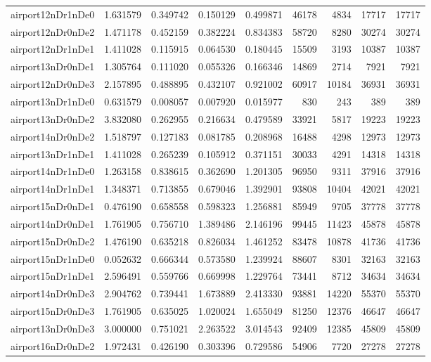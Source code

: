\begin{longtable}{|l|r|r|r|r|r|r|r|r|}
airport12nDr1nDe0 & 1.631579 & 0.349742 & 0.150129 & 0.499871 & 46178 & 4834 & 17717 & 17717 \\
airport12nDr0nDe2 & 1.471178 & 0.452159 & 0.382224 & 0.834383 & 58720 & 8280 & 30274 & 30274 \\
airport12nDr1nDe1 & 1.411028 & 0.115915 & 0.064530 & 0.180445 & 15509 & 3193 & 10387 & 10387 \\
airport13nDr0nDe1 & 1.305764 & 0.111020 & 0.055326 & 0.166346 & 14869 & 2714 & 7921 & 7921 \\
airport12nDr0nDe3 & 2.157895 & 0.488895 & 0.432107 & 0.921002 & 60917 & 10184 & 36931 & 36931 \\
airport13nDr1nDe0 & 0.631579 & 0.008057 & 0.007920 & 0.015977 & 830 & 243 & 389 & 389 \\
airport13nDr0nDe2 & 3.832080 & 0.262955 & 0.216634 & 0.479589 & 33921 & 5817 & 19223 & 19223 \\
airport14nDr0nDe2 & 1.518797 & 0.127183 & 0.081785 & 0.208968 & 16488 & 4298 & 12973 & 12973 \\
airport13nDr1nDe1 & 1.411028 & 0.265239 & 0.105912 & 0.371151 & 30033 & 4291 & 14318 & 14318 \\
airport14nDr1nDe0 & 1.263158 & 0.838615 & 0.362690 & 1.201305 & 96950 & 9311 & 37916 & 37916 \\
airport14nDr1nDe1 & 1.348371 & 0.713855 & 0.679046 & 1.392901 & 93808 & 10404 & 42021 & 42021 \\
airport15nDr0nDe1 & 0.476190 & 0.658558 & 0.598323 & 1.256881 & 85949 & 9705 & 37778 & 37778 \\
airport14nDr0nDe1 & 1.761905 & 0.756710 & 1.389486 & 2.146196 & 99445 & 11423 & 45878 & 45878 \\
airport15nDr0nDe2 & 1.476190 & 0.635218 & 0.826034 & 1.461252 & 83478 & 10878 & 41736 & 41736 \\
airport15nDr1nDe0 & 0.052632 & 0.666344 & 0.573580 & 1.239924 & 88607 & 8301 & 32163 & 32163 \\
airport15nDr1nDe1 & 2.596491 & 0.559766 & 0.669998 & 1.229764 & 73441 & 8712 & 34634 & 34634 \\
airport14nDr0nDe3 & 2.904762 & 0.739441 & 1.673889 & 2.413330 & 93881 & 14220 & 55370 & 55370 \\
airport15nDr0nDe3 & 1.761905 & 0.635025 & 1.020024 & 1.655049 & 81250 & 12376 & 46647 & 46647 \\
airport13nDr0nDe3 & 3.000000 & 0.751021 & 2.263522 & 3.014543 & 92409 & 12385 & 45809 & 45809 \\
airport16nDr0nDe2 & 1.972431 & 0.426190 & 0.303396 & 0.729586 & 54906 & 7720 & 27278 & 27278 \\

\end{longtable}
